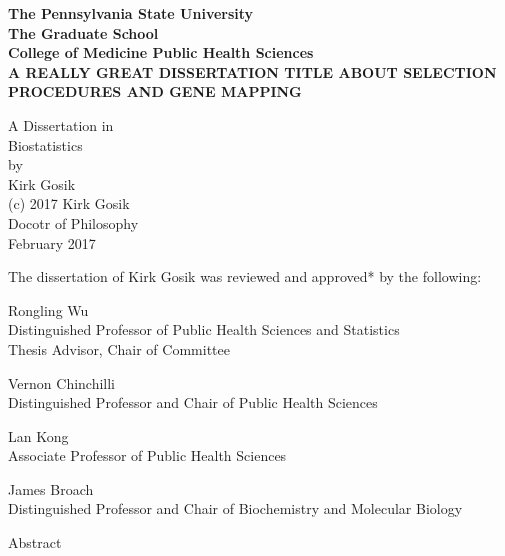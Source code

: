 \center
\bf{The Pennsylvania State University} \\
The Graduate School \\
College of Medicine Public Health Sciences \\


A REALLY GREAT DISSERTATION TITLE ABOUT SELECTION PROCEDURES AND GENE MAPPING


A Dissertation in \\
Biostatistics \\
by \\
Kirk Gosik \\
(c) 2017 Kirk Gosik \\

Docotr of Philosophy \\
February 2017 \\

\newpage

The dissertation of Kirk Gosik was reviewed and approved* by the following:

Rongling Wu \\
Distinguished Professor of Public Health Sciences and Statistics \\
Thesis Advisor, Chair of Committee

Vernon Chinchilli \\
Distinguished Professor and Chair of Public Health Sciences


Lan Kong \\
Associate Professor of Public Health Sciences

James Broach \\
Distinguished Professor and Chair of Biochemistry and Molecular Biology \\



\newpage

Abstract

